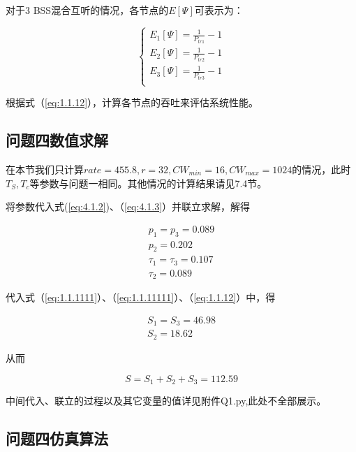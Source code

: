 \documentclass[bwprint]{gmcmthesis}
\begin{document}
对于3 BSS混合互听的情况，各节点的$E[\Psi ]$可表示为：

\begin{equation}
\left\{\begin{array}{l}
E_1[\Psi ] = \frac{1}{P_{tr1} }-1 \\
E_2[\Psi ] = \frac{1}{P_{tr2} }-1 \\
E_3[\Psi ] = \frac{1}{P_{tr3} }-1 \\
\end{array}\right.
    \label{eq:4.1.5}
\end{equation}

根据式（\ref{eq:1.1.12}），计算各节点的吞吐来评估系统性能。

\subsection{问题四数值求解}

在本节我们只计算$rate=455.8,r=32,CW_{min}=16,CW_{max}=1024$的情况，此时$T_S,T_c$等参数与问题一相同。其他情况的计算结果请见7.4节。

将参数代入式(\ref{eq:4.1.2})、（\ref{eq:4.1.3}）并联立求解，解得

\begin{equation}
\begin{array}{l}
p_1 = p_3 = 0.089 \\
p_2 = 0.202 \\
\tau_1 = \tau_3 = 0.107 \\
\tau_2 = 0.089
\label{结果}
\end{array}
\end{equation}

代入式（\ref{eq:1.1.1111}）、（\ref{eq:1.1.11111}）、（\ref{eq:1.1.12}）中，得

\begin{equation}
    \begin{array}{l}
S_1 = S_3 = 46.98 \\
S_2 = 18.62
    \end{array}
\end{equation}

从而

\begin{equation}
S = S_1+S_2+S_3 = 112.59
\end{equation}

中间代入、联立的过程以及其它变量的值详见附件Q1.py,此处不全部展示。

\subsection{问题四仿真算法}
\end{document}
